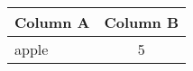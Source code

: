 



\small %
\begin{tabular}{l|c}
\toprule
\textbf{Column A} & \textbf{Column B}  \\
\midrule
apple & 5 \\
\bottomrule
\end{tabular}